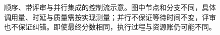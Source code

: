 \begin{figure}[htbp]
\centering

\caption{顺序、带评审与并行集成的控制流示意。图中节点和分支不同，具体调用量、时延与质量需按实现测量；并行不保证等待时间不变，评审也不保证纠错。即使最终分数相同，执行过程与资源账仍可能不同。}
\label{fig:ch09-workflow}
\end{figure}
